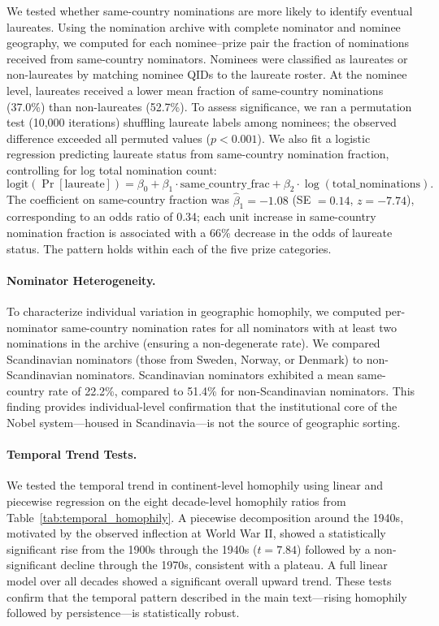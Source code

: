 \documentclass[12pt]{article}
\begin{document}
We tested whether same-country nominations are more likely to identify eventual laureates. Using the nomination archive with complete nominator and nominee geography, we computed for each nominee--prize pair the fraction of nominations received from same-country nominators. Nominees were classified as laureates or non-laureates by matching nominee QIDs to the laureate roster. At the nominee level, laureates received a lower mean fraction of same-country nominations (37.0\%) than non-laureates (52.7\%). To assess significance, we ran a permutation test (10,000 iterations) shuffling laureate labels among nominees; the observed difference exceeded all permuted values ($p < 0.001$). We also fit a logistic regression predicting laureate status from same-country nomination fraction, controlling for log total nomination count:
\[
\text{logit}(\Pr[\text{laureate}]) = \beta_0 + \beta_1 \cdot \text{same\_country\_frac} + \beta_2 \cdot \log(\text{total\_nominations}).
\]
The coefficient on same-country fraction was $\hat{\beta}_1 = -1.08$ (SE $= 0.14$, $z = -7.74$), corresponding to an odds ratio of 0.34; each unit increase in same-country nomination fraction is associated with a 66\% decrease in the odds of laureate status. The pattern holds within each of the five prize categories.

\paragraph*{Nominator Heterogeneity.}

To characterize individual variation in geographic homophily, we computed per-nominator same-country nomination rates for all nominators with at least two nominations in the archive (ensuring a non-degenerate rate). We compared Scandinavian nominators (those from Sweden, Norway, or Denmark) to non-Scandinavian nominators. Scandinavian nominators exhibited a mean same-country rate of 22.2\%, compared to 51.4\% for non-Scandinavian nominators. This finding provides individual-level confirmation that the institutional core of the Nobel system---housed in Scandinavia---is not the source of geographic sorting.

\paragraph*{Temporal Trend Tests.}

We tested the temporal trend in continent-level homophily using linear and piecewise regression on the eight decade-level homophily ratios from Table~\ref{tab:temporal_homophily}. A piecewise decomposition around the 1940s, motivated by the observed inflection at World War II, showed a statistically significant rise from the 1900s through the 1940s ($t = 7.84$) followed by a non-significant decline through the 1970s, consistent with a plateau. A full linear model over all decades showed a significant overall upward trend. These tests confirm that the temporal pattern described in the main text---rising homophily followed by persistence---is statistically robust.
\end{document}

